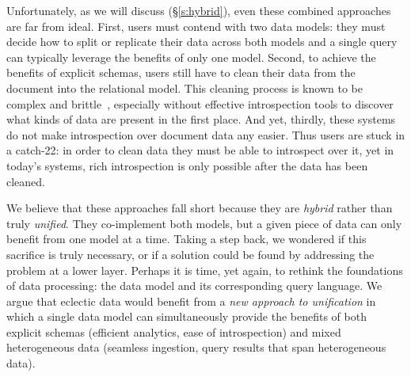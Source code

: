 Unfortunately, as we will discuss (\S\ref{s:hybrid}), even these combined approaches are far from ideal. First, users must contend with two data models: they must decide how to split or replicate their data across both models and a single query can typically leverage the benefits of only one model. Second, to achieve the benefits of explicit schemas, users still have to clean their data from the document into the relational model. This cleaning process is known to be complex and brittle~, especially without effective introspection tools to discover what kinds of data are present in the first place. And yet, thirdly, these systems do not make introspection over document data any easier. Thus users are stuck in a catch-22: in order to clean data they must be able to introspect over it, yet in today's systems, rich introspection is only possible after the data has been cleaned.

We believe that these approaches fall short because they are {\em hybrid} rather than truly {\em unified}. They co-implement both models,
but a given piece of data can only benefit from one model at a time.
Taking a step back, we wondered if this sacrifice is truly necessary, or if a solution could be found by addressing the problem at a lower layer. Perhaps it is time, yet again, to rethink the foundations of data processing: the data model and its corresponding query language.
We argue that eclectic data would benefit from a {\em new approach to unification} in which a single data model can simultaneously provide the benefits of both explicit schemas (efficient analytics, ease of introspection) and mixed heterogeneous data (seamless ingestion, query results that span heterogeneous data).%


